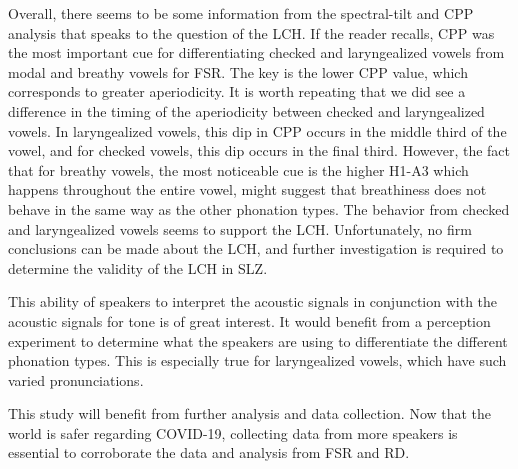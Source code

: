 \documentclass[12pt, letterpaper]{article}
\begin{document}
Overall, there seems to be some information from the spectral-tilt and CPP analysis that speaks to the question of the LCH. If the reader recalls, CPP was the most important cue for differentiating checked and laryngealized vowels from modal and breathy vowels for FSR. The key is the lower CPP value, which corresponds to greater aperiodicity. It is worth repeating that we did see a difference in the timing of the aperiodicity between checked and laryngealized vowels. In laryngealized vowels, this dip in CPP occurs in the middle third of the vowel, and for checked vowels, this dip occurs in the final third. However, the fact that for breathy vowels, the most noticeable cue is the higher H1-A3 which happens throughout the entire vowel, might suggest that breathiness does not behave in the same way as the other phonation types. The behavior from checked and laryngealized vowels seems to support the LCH. Unfortunately, no firm conclusions can be made about the LCH, and further investigation is required to determine the validity of the LCH in SLZ. 

This ability of speakers to interpret the acoustic signals in conjunction with the acoustic signals for tone is of great interest. It would benefit from a perception experiment to determine what the speakers are using to differentiate the different phonation types. This is especially true for laryngealized vowels, which have such varied pronunciations. 

This study will benefit from further analysis and data collection. Now that the world is safer regarding COVID-19, collecting data from more speakers is essential to corroborate the data and analysis from FSR and RD. 


\printbibliography[heading=bibintoc]
\end{document}

